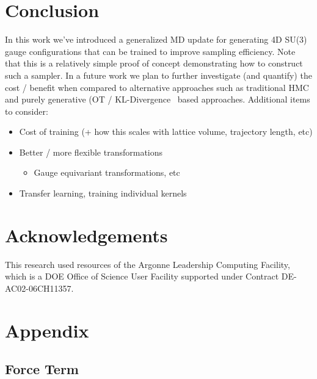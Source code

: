 \documentclass[a4paper,11pt]{article}
\begin{document}
\section{\label{sec:conclusion}Conclusion}
%
In this work we've introduced a generalized MD update for generating 4D SU(3) gauge configurations that can be trained to improve sampling efficiency.
%
Note that this is a relatively simple proof of concept demonstrating how to construct such a sampler.
%
In a future work we plan to further investigate (and quantify) the cost / benefit when compared to alternative approaches such as traditional HMC and purely generative (OT / KL-Divergence~\cite{albergo_flow-based_2019,albergo_introduction_2021,boyda_sampling_2021,kanwar_equivariant_2020} based approaches.
%
Additional items to consider:
\begin{itemize}
    \item{Cost of training (+ how this scales with lattice volume, trajectory length, etc)}
    \item{Better / more flexible transformations}
    \begin{itemize}
        \item Gauge equivariant transformations, etc
    \end{itemize}
    \item{Transfer learning, training individual kernels}
\end{itemize}

\section{\label{sec:acknowledgements}Acknowledgements}
This research used resources of the Argonne Leadership Computing Facility,
which is a DOE Office of Science User Facility supported under Contract DE-AC02-06CH11357.

\appendix

\section{\label{appendix}Appendix}

\subsection{\label{subsec:force_term}Force Term}
\end{document}
